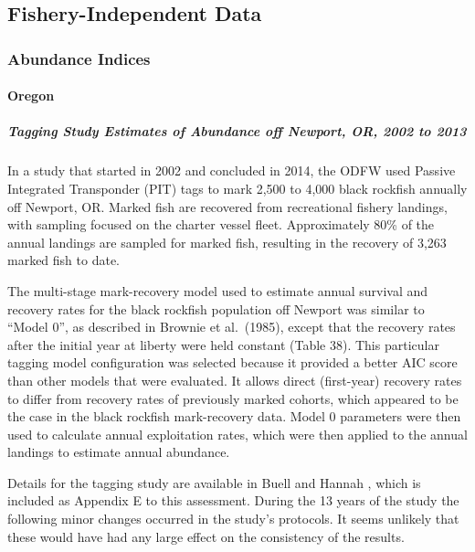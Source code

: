 \documentclass[11pt,
  english,
  letterpaper,
]{article}
\begin{document}
\hypertarget{fishery-independent-data}{%
\subsection{Fishery-Independent Data}\label{fishery-independent-data}}

\hypertarget{abundance-indices-1}{%
\subsubsection{Abundance Indices}\label{abundance-indices-1}}

\hypertarget{oregon-1}{%
\paragraph{Oregon}\label{oregon-1}}

\hypertarget{tagging-study-estimates-of-abundance-off-newport-or-2002-to-2013}{%
\subparagraph{Tagging Study Estimates of Abundance off Newport, OR, 2002 to 2013}\label{tagging-study-estimates-of-abundance-off-newport-or-2002-to-2013}}

In a study that started in 2002 and concluded in 2014, the ODFW used Passive Integrated Transponder (PIT) tags to mark 2,500 to 4,000 black rockfish annually off Newport, OR. Marked fish are recovered from recreational fishery landings, with sampling focused on the charter vessel fleet. Approximately 80\% of the annual landings are sampled for marked fish, resulting in the recovery of 3,263 marked fish to date.

The multi-stage mark-recovery model used to estimate annual survival and recovery rates for the black rockfish population off Newport was similar to ``Model 0'', as described in Brownie et al.~(1985), except that the recovery rates after the initial year at liberty were held constant (Table 38). This particular tagging model configuration was selected because it provided a better AIC score than other models that were evaluated. It allows direct (first-year) recovery rates to differ from recovery rates of previously marked cohorts, which appeared to be the case in the black rockfish mark-recovery data. Model 0 parameters were then used to calculate annual exploitation rates, which were then applied to the annual landings to estimate annual abundance.

Details for the tagging study are available in Buell and Hannah , which is included as Appendix E to this assessment. During the 13 years of the study the following minor changes occurred in the study's protocols. It seems unlikely that these would have had any large effect on the consistency of the results.
\end{document}
